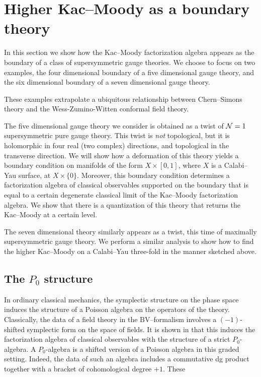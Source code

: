 \section{Higher Kac--Moody as a boundary theory}

In this section we show how the Kac--Moody factorization algebra appears as the boundary of a class of supersymmetric gauge theories. 
We choose to focus on two examples, the four dimensional boundary of a five dimensional gauge theory, and the six dimensional boundary of a seven dimensional gauge theory.

These examples extrapolate a ubiquitous relationship between Chern--Simons theory and the Wess-Zumino-Witten conformal field theory.

The five dimensional gauge theory we consider is obtained as a twist of $\mathcal N=1$ supersymmetric pure gauge theory.
This twist is {\em not} topological, but it is holomorphic in four real (two complex) directions, and topological in the transverse direction.
We will show how a deformation of this theory yields a boundary condition on manifolds of the form $X \times [0,1]$, where $X$ is a Calabi--Yau surface, at $X \times \{0\}$. 
Moreover, this boundary condition determines a factorization algebra of classical observables supported on the boundary that is equal to a certain degenerate classical limit of the Kac--Moody factorization algebra. 
We show that there is a quantization of this theory that returns the Kac--Moody at a certain level.  

The seven dimensional theory similarly appears as a twist, this time of maximally supersymmetric gauge theory. 
We perform a similar analysis to show how to find the higher Kac--Moody on a Calabi--Yau three-fold in the manner sketched above.

\subsection{The $P_0$ structure}

In ordinary classical mechanics, the symplectic structure on the phase space induces the structure of a Poisson algebra on the operators of the theory.
Classically, the data of a field theory in the BV--formalism involves a $(-1)$-shifted symplectic form on the space of fields. 
It is shown in \cite{CG2} that this induces the factorization algebra of classical observables with the structure of a strict $P_0$-algebra.
A $P_0$-algebra is a shifted version of a Poisson algebra in this graded setting.
Indeed, the data of such an algebra includes a commutative dg product together with a bracket of cohomological degree $+1$. 
These 

